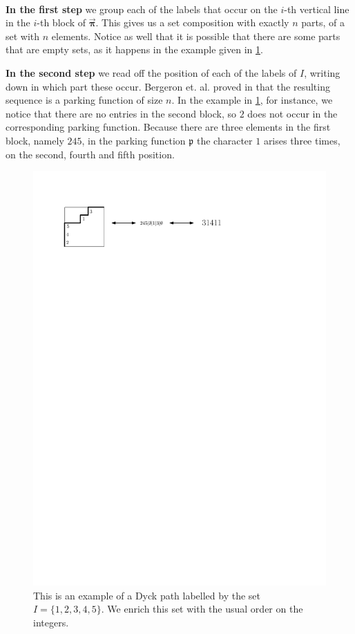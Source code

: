 \documentclass[12pt, reqno]{amsart}
\theoremstyle{definition}
\newcommand{\opi}{\vec{\boldsymbol{\pi}}}
\begin{document}
\

\textbf{In the first step} we group each of the labels that occur on the $i$-th vertical line in the $i$-th block of $\opi$.
This gives us a set composition with exactly $n$ parts, of a set with $n$ elements.
Notice as well that it is possible that there are some parts that are empty sets, as it happens in the example given in \cref{fig:construction_parking}.

\textbf{In the second step} we read off the position of each of the labels of $I$, writing down in which part these occur.
Bergeron et. al. proved in \cite{BGLPV2021} that the resulting sequence is a parking function of size $n$.
In the example in \cref{fig:construction_parking}, for instance, we notice that there are no entries in the second block, so $2$ does not occur in the corresponding parking function.
Because there are three elements in the first block, namely $245$, in the parking function $\mathfrak p $ the character $1$ arises three times, on the second, fourth and fifth position.

\begin{figure}
    \centering
    \includegraphics{images/correspondence_parking.pdf}
    \caption{This is an example of a Dyck path labelled by the set $I =\{1, 2, 3, 4, 5\}$. We enrich this set with the usual order on the integers.}
    \label{fig:construction_parking}
\end{figure}
\end{document}
